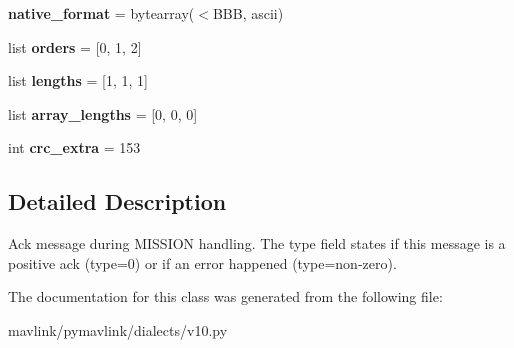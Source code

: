 \begin{DoxyCompactItemize}
{\bfseries native\+\_\+format} = bytearray(\textquotesingle{}$<$B\+BB\textquotesingle{}, \textquotesingle{}ascii\textquotesingle{})
\item 
\mbox{\label{classpymavlink_1_1dialects_1_1v10_1_1MAVLink__mission__ack__message_a8a305ce70daa6d240a711910390d742b}} 
list {\bfseries orders} = \mbox{[}0, 1, 2\mbox{]}
\item 
\mbox{\label{classpymavlink_1_1dialects_1_1v10_1_1MAVLink__mission__ack__message_aad395a18f1de817a8035d76cbb1e3824}} 
list {\bfseries lengths} = \mbox{[}1, 1, 1\mbox{]}
\item 
\mbox{\label{classpymavlink_1_1dialects_1_1v10_1_1MAVLink__mission__ack__message_a98ddc7a876b40dded2ac6366a0b7c1e3}} 
list {\bfseries array\+\_\+lengths} = \mbox{[}0, 0, 0\mbox{]}
\item 
\mbox{\label{classpymavlink_1_1dialects_1_1v10_1_1MAVLink__mission__ack__message_a3ef22ec2e2426c15a06a955d68a3391f}} 
int {\bfseries crc\+\_\+extra} = 153
\end{DoxyCompactItemize}


\subsection{Detailed Description}
\begin{DoxyVerb}Ack message during MISSION handling. The type field states if
this message is a positive ack (type=0) or if an error
happened (type=non-zero).
\end{DoxyVerb}
 

The documentation for this class was generated from the following file\+:\begin{DoxyCompactItemize}
\item 
mavlink/pymavlink/dialects/v10.\+py\end{DoxyCompactItemize}
